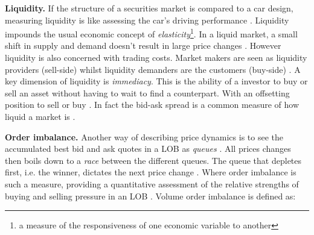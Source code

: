 \documentclass{kththesis}
\theoremstyle{definition}
\begin{document}
\textbf{Liquidity.} If the structure of a securities market is compared to a car design, measuring liquidity is like assessing the car's driving performance \parencite{foucault2013market}. Liquidity impounds the usual economic concept of \textit{elasticity}\footnote{a measure of the responsiveness of one economic variable to another}. In a liquid market, a small shift in supply and demand doesn't result in large price changes \parencite{hasbrouck2007empirical}. However liquidity is also concerned with trading costs. Market makers are seen as liquidity providers (sell-side) whilst liquidity demanders are the customers (buy-side) \parencite{hasbrouck2007empirical}. A key dimension of liquidity is \textit{immediacy}. This is the ability of a investor to buy or sell an asset without having to wait to find a counterpart. With an offsetting position to sell or buy \parencite{cartea2015algorithmic}. In fact the bid-ask spread is a common measure of how liquid a market is \parencite{foucault2013market}.
\newline

\textbf{Order imbalance.} Another way of describing price dynamics is to see the accumulated best bid and ask quotes in a LOB as \textit{queues} \parencite{bouchaud2018trades}. All prices changes then boils down to a \textit{race} between the different queues. The queue that depletes first, i.e. the winner, dictates the next price change \parencite{bouchaud2018trades}. Where order imbalance is such a measure, providing a quantitative assessment of the relative strengths of buying and selling pressure in an LOB \parencite{bouchaud2018trades}. Volume order imbalance is defined as:
\end{document}

